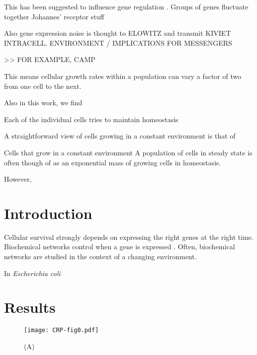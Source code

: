 This has been suggested to influence gene regulation \cite{Rosenfeld2005}.
Groups of genes fluctuate together \cite{Stewart-Ornstein2012}
Johannes' receptor stuff


Also gene expression noise is thought to ELOWITZ
and transmit KIVIET
INTRACELL. ENVIRONMENT / IMPLICATIONS FOR MESSENGERS 

>> FOR EXAMPLE, CAMP

%
This means cellular growth rates within a population can vary a factor of two from one cell to the next.

Also in this work, we find 



Each of the individual cells tries to maintain homeostasis 


A straightforward view of cells growing in a constant environment is that of 

Cells that grow in a constant environment 
A population of cells in steady state is often though of as an exponential mass of growing cells in homeostasis.
%

% 
However, 

\section{Introduction}


Cellular survival strongly depends on expressing the right genes at the right time.
Biochemical networks control when a gene is expressed \cite{Bray1995, Alon2006, Alon2007, Tyson2010}.
%
Often, biochemical networks are studied in the context of a changing environment.
%







In \textit{Escherichia coli}

\section{Results}

\begin{figure}
	\centering
	\texttt{[image: CRP-fig0.pdf]}
	\caption{ 
		(A) 
	}
	\label{fig:CRP:fig0}
\end{figure}


